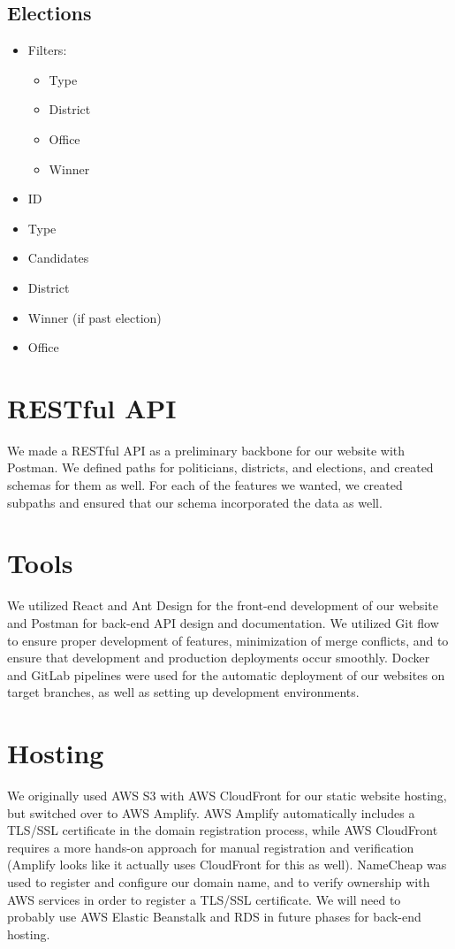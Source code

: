 \documentclass[11t]{article}
\begin{document}
\subsection{Elections}
\begin{itemize}
    \item Filters:
    \begin{itemize}
        \item Type
        \item District
        \item Office
        \item Winner
    \end{itemize}
    \item ID
    \item Type
    \item Candidates
    \item District
    \item Winner (if past election)
    \item Office
\end{itemize}

\section{RESTful API}
We made a RESTful API as a preliminary backbone for our website with Postman. We defined paths for politicians, districts, and elections, and created schemas for them as well. For each of the features we wanted, we created subpaths and ensured that our schema incorporated the data as well. 

\section{Tools}
We utilized React and Ant Design for the front-end development of our website and Postman for back-end API design and documentation. We utilized Git flow to ensure proper development of features, minimization of merge conflicts, and to ensure that development and production deployments occur smoothly. Docker and GitLab pipelines were used for the automatic deployment of our websites on target branches, as well as setting up development environments.

\section{Hosting}
We originally used AWS S3 with AWS CloudFront for our static website hosting, but switched over to AWS Amplify. AWS Amplify automatically includes a TLS/SSL certificate in the domain registration process, while AWS CloudFront requires a more hands-on approach for manual registration and verification (Amplify looks like it actually uses CloudFront for this as well). NameCheap was used to register and configure our domain name, and to verify ownership with AWS services in order to register a TLS/SSL certificate. We will need to probably use AWS Elastic Beanstalk and RDS in future phases for back-end hosting.
\end{document}
